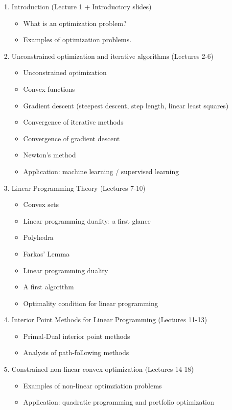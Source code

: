 \documentclass[11pt,a4paper]{memoir}
\begin{document}
\begin{enumerate}
\item Introduction (Lecture 1 + Introductory slides)
\begin{itemize}
 \item What is an optimization problem?
 \item Examples of optimization problems.
\end{itemize}
\item Unconstrained optimization and iterative algorithms (Lectures 2-6)
\begin{itemize}
 \item Unconstrained optimization
 \item Convex functions
 \item Gradient descent (steepest descent, step length, linear least squares)
 \item Convergence of iterative methods
 \item Convergence of gradient descent
 \item Newton's method
 \item Application: machine learning / supervised learning
\end{itemize}
\item Linear Programming Theory (Lectures 7-10)
\begin{itemize}
 \item Convex sets
 \item Linear programming duality: a first glance
 \item Polyhedra
 \item Farkas' Lemma
 \item Linear programming duality
 \item A first algorithm
 \item Optimality condition for linear programming
\end{itemize}
\item Interior Point Methods for Linear Programming (Lectures 11-13)
\begin{itemize}
\item Primal-Dual interior point methods
\item Analysis of path-following methods
\end{itemize}
\item Constrained non-linear convex optimization (Lectures 14-18)
\begin{itemize}
\item Examples of non-linear optimziation problems
\item Application: quadratic programming and portfolio optimization

\end{itemize}
\end{enumerate}
\end{document}

